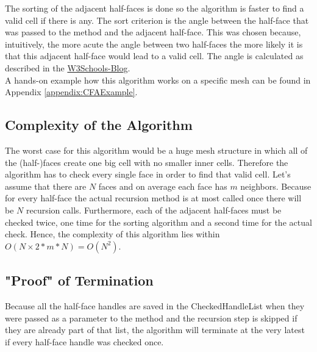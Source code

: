 \documentclass{report}
\begin{document}
			The sorting of the adjacent half-faces is done so the algorithm is faster to find a valid cell if there is any. The sort criterion is the angle between the half-face that was passed to the method and the adjacent half-face. This was chosen because, intuitively, the more acute the angle between two half-faces the more likely it is that this adjacent half-face would lead to a valid cell. The angle is calculated as described in the \href{https://www.w3schools.blog/angle-between-two-planes}{W3Schools-Blog}. \\
			A hands-on example how this algorithm works on a specific mesh can be found in Appendix \ref{appendix:CFAExample}.
		\closesection
		\subsection{Complexity of the Algorithm}
		\startsubsection
			The worst case for this algorithm would be a huge mesh structure in which all of the (half-)faces create one big cell with no smaller inner cells. Therefore the algorithm has to check every single face in order to find that valid cell. Let's assume that there are $N$ faces and on average each face has $m$ neighbors. Because for every half-face the actual recursion method is at most called once there will be $N$ recursion calls. Furthermore, each of the adjacent half-faces must be checked twice, one time for the sorting algorithm and a second time for the actual check. Hence, the complexity of this algorithm lies within $O(N \times 2*m*N) = O(N^2)$.
		\closesection
		\subsection{"Proof" of Termination}
		\startsubsection
			Because all the half-face handles are saved in the CheckedHandleList when they were passed as a parameter to the method and the recursion step is skipped if they are already part of that list, the algorithm will terminate at the very latest if every half-face handle was checked once.
		\closesection
	\closesection
	
	\newpage	
	
\end{document}
